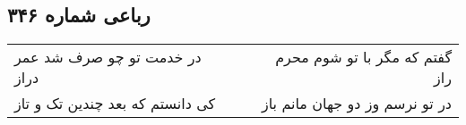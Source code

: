\begin{center}
\section*{رباعی شماره ۳۴۶}
\label{sec:sh346}
\begin{longtable}{l p{0.5cm} r}
در خدمت تو چو صرف شد عمر دراز
&&
گفتم که مگر با تو شوم محرم راز
\\
کی دانستم که بعد چندین تک و تاز
&&
در تو نرسم وز دو جهان مانم باز
\\
\end{longtable}
\end{center}
